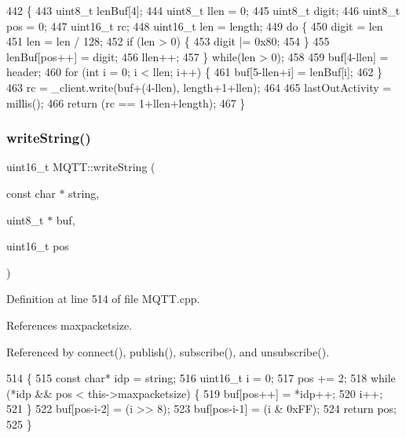 \begin{DoxyCode}
442                                                               \{
443     uint8\_t lenBuf[4];
444     uint8\_t llen = 0;
445     uint8\_t digit;
446     uint8\_t pos = 0;
447     uint16\_t rc;
448     uint16\_t len = length;
449     \textcolor{keywordflow}{do} \{
450         digit = len %
451         len = len / 128;
452         \textcolor{keywordflow}{if} (len > 0) \{
453             digit |= 0x80;
454         \}
455         lenBuf[pos++] = digit;
456         llen++;
457     \} \textcolor{keywordflow}{while}(len > 0);
458 
459     buf[4-llen] = header;
460     \textcolor{keywordflow}{for} (\textcolor{keywordtype}{int} i = 0; i < llen; i++) \{
461         buf[5-llen+i] = lenBuf[i];
462     \}
463     rc = _client.write(buf+(4-llen), length+1+llen);
464 
465     lastOutActivity = millis();
466     \textcolor{keywordflow}{return} (rc == 1+llen+length);
467 \}
\end{DoxyCode}
\mbox{\label{class_m_q_t_t_ae75a977549b28466d0a40cdf90e49c01}} 
\subsubsection{write\+String()}
{\footnotesize\ttfamily uint16\+\_\+t M\+Q\+T\+T\+::write\+String (\begin{DoxyParamCaption}\item[{const char $\ast$}]{string,  }\item[{uint8\+\_\+t $\ast$}]{buf,  }\item[{uint16\+\_\+t}]{pos }\end{DoxyParamCaption})\hspace{0.3cm}{\ttfamily [private]}}



Definition at line 514 of file M\+Q\+T\+T.\+cpp.



References maxpacketsize.



Referenced by connect(), publish(), subscribe(), and unsubscribe().


\begin{DoxyCode}
514                                                                          \{
515     \textcolor{keyword}{const} \textcolor{keywordtype}{char}* idp = string;
516     uint16\_t i = 0;
517     pos += 2;
518     \textcolor{keywordflow}{while} (*idp && pos < this->maxpacketsize) \{
519         buf[pos++] = *idp++;
520         i++;
521     \}
522     buf[pos-i-2] = (i >> 8);
523     buf[pos-i-1] = (i & 0xFF);
524     \textcolor{keywordflow}{return} pos;
525 \}
\end{DoxyCode}


